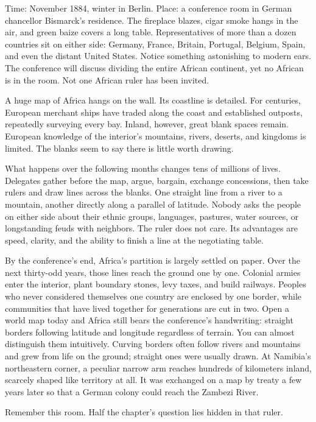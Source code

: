 Time: November 1884, winter in Berlin. Place: a conference room in German chancellor Bismarck's residence. The fireplace blazes, cigar smoke hangs in the air, and green baize covers a long table. Representatives of more than a dozen countries sit on either side: Germany, France, Britain, Portugal, Belgium, Spain, and even the distant United States. Notice something astonishing to modern ears. The conference will discuss dividing the entire African continent, yet no African is in the room. Not one African ruler has been invited.

A huge map of Africa hangs on the wall. Its coastline is detailed. For centuries, European merchant ships have traded along the coast and established outposts, repeatedly surveying every bay. Inland, however, great blank spaces remain. European knowledge of the interior's mountains, rivers, deserts, and kingdoms is limited. The blanks seem to say there is little worth drawing.

What happens over the following months changes tens of millions of lives. Delegates gather before the map, argue, bargain, exchange concessions, then take rulers and draw lines across the blanks. One straight line from a river to a mountain, another directly along a parallel of latitude. Nobody asks the people on either side about their ethnic groups, languages, pastures, water sources, or longstanding feuds with neighbors. The ruler does not care. Its advantages are speed, clarity, and the ability to finish a line at the negotiating table.

By the conference's end, Africa's partition is largely settled on paper. Over the next thirty-odd years, those lines reach the ground one by one. Colonial armies enter the interior, plant boundary stones, levy taxes, and build railways. Peoples who never considered themselves one country are enclosed by one border, while communities that have lived together for generations are cut in two. Open a world map today and Africa still bears the conference's handwriting: straight borders following latitude and longitude regardless of terrain. You can almost distinguish them intuitively. Curving borders often follow rivers and mountains and grew from life on the ground; straight ones were usually drawn. At Namibia's northeastern corner, a peculiar narrow arm reaches hundreds of kilometers inland, scarcely shaped like territory at all. It was exchanged on a map by treaty a few years later so that a German colony could reach the Zambezi River.

Remember this room. Half the chapter's question lies hidden in that ruler.


